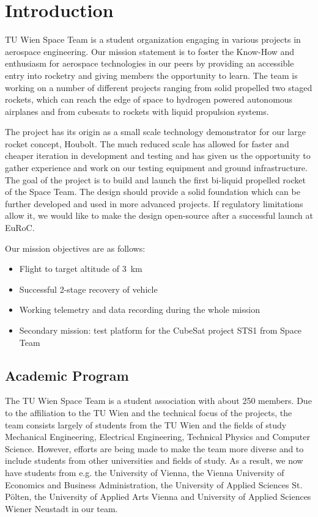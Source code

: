 \chapter{Introduction} %

TU Wien Space Team is a student organization engaging in various projects in aerospace engineering. Our mission statement is to foster the Know-How and enthusiasm for aerospace technologies in our peers by providing an accessible entry into rocketry and giving members the opportunity to learn. The team is working on a number of different projects ranging from solid propelled two staged rockets, which can reach the edge of space to hydrogen powered autonomous airplanes and from cubesats to rockets with liquid propulsion systems.

The \uH project has its origin as a small scale technology demonstrator for our large rocket concept, Houbolt. The much reduced scale has allowed for faster and cheaper iteration in development and testing and has given us the opportunity to gather experience and work on our testing equipment and ground infrastructure. The goal of the project is to build and launch the first bi-liquid propelled rocket of the Space Team. The design should provide a solid foundation which can be further developed and used in more advanced projects. If regulatory limitations allow it, we would like to make the design open-source after a successful launch at EuRoC.

Our mission objectives are as follows:
\begin{itemize}
    \item Flight to target altitude of \SI{3}{\kilo\meter}
    \item Successful 2-stage recovery of vehicle
    \item Working telemetry and data recording during the whole mission
    \item Secondary mission: test platform for the CubeSat project STS1 from Space Team
\end{itemize}

\section{Academic Program} %
The TU Wien Space Team is a student association with about 250 members. Due to the affiliation to the TU Wien and the technical focus of the projects, the team consists largely of students from the TU Wien and the fields of study Mechanical Engineering, Electrical Engineering, Technical Physics and Computer Science.
However, efforts are being made to make the team more diverse and to include students from other universities and fields of study. As a result, we now have students from e.g. the University of Vienna, the Vienna University of Economics and Business Administration, the University of Applied Sciences St. Pölten, the University of Applied Arts Vienna and University of Applied Sciences Wiener Neustadt in our team.


